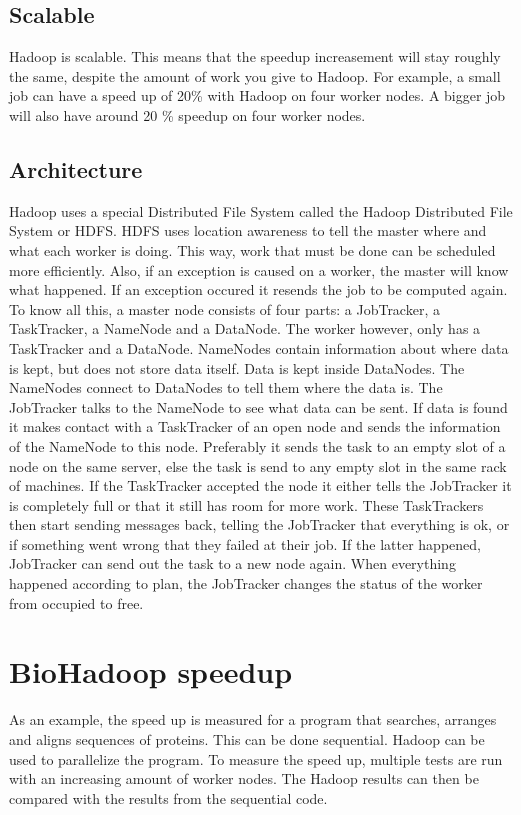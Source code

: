 \documentclass[a4paper]{article}
\begin{document}
  \subsection{Scalable}
    Hadoop is scalable. This means that the speedup increasement will stay
    roughly the same, despite the amount of work you give to Hadoop.
    For example, a small job can have a speed up of 20\% with Hadoop on four
    worker nodes. A bigger job will also have around 20 \% speedup on four
    worker nodes.
    
  \subsection{Architecture}
    Hadoop uses a special Distributed File System called the Hadoop
    Distributed File System or HDFS. HDFS uses location awareness to tell
    the master where and what each worker is doing. This way, work that must
    be done can be scheduled more efficiently. Also, if an exception is caused
    on a worker, the master will know what happened. If an exception occured
    it resends the job to be computed again.\\
    To know all this, a master node consists of four parts: a JobTracker,
    a TaskTracker, a NameNode and a DataNode. The worker however, only has a
    TaskTracker and a DataNode.
    NameNodes contain information about where data is kept, but does not store
    data itself. Data is kept inside DataNodes. The NameNodes connect to 
    DataNodes to tell them where the data is.
    The JobTracker talks to the NameNode
    to see what data can be sent. If data is found it makes contact with a
    TaskTracker of an open node and sends the information of the NameNode
    to this node. Preferably it sends the task to an empty slot of a node
    on the same server, else the task is send to any empty slot in the same
    rack of machines. If the TaskTracker accepted the node it either tells
    the JobTracker it is completely full or that it still has room for more
    work. These TaskTrackers then start sending messages back, telling the
    JobTracker that everything is ok, or if something went wrong that they
    failed at their job. If the latter happened, JobTracker can send out
    the task to a new node again. When everything happened according to plan,
    the JobTracker changes the status of the worker from occupied to free.
    
  \section{BioHadoop speedup}
    As an example, the speed up is measured for a program that searches,
    arranges and aligns sequences of proteins. This can be done sequential.
    Hadoop can be used to parallelize the program. To measure the speed up,
    multiple tests are run with an increasing amount of worker nodes. The
    Hadoop results can then be compared with the results from the sequential code.
  
\end{document}
